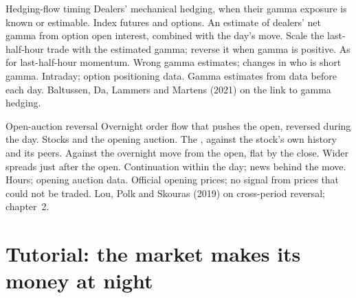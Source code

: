 \begin{strategyfile}{Hedging-flow timing}\label{strat:s1:intraday-patterns:hedging}
 Dealers' mechanical hedging, when their gamma exposure is known or estimable.
 Index futures and options.
 An estimate of dealers' net gamma from option open interest, combined with the day's move.
 Scale the last-half-hour trade with the estimated gamma; reverse it when gamma is positive.
 As for last-half-hour momentum.
 Wrong gamma estimates; changes in who is short gamma.
 Intraday; option positioning data.
 Gamma estimates from data before each day.
 Baltussen, Da, Lammers and Martens (2021) on the link to gamma hedging.
\end{strategyfile}

\begin{strategyfile}{Open-auction reversal}\label{strat:s1:intraday-patterns:openreversal}
 Overnight order flow that pushes the open, reversed during the day.
 Stocks and the opening auction.
 The , against the stock's own history and its peers.
 Against the overnight move from the open, flat by the close.
 Wider spreads just after the open.
 Continuation within the day; news behind the move.
 Hours; opening auction data.
 Official opening prices; no signal from prices that could not be traded.
 Lou, Polk and Skouras (2019) on cross-period reversal; chapter~2.
\end{strategyfile}

\section{Tutorial: the market makes its money at night}\label{tut:s1:intraday-patterns:tut}

